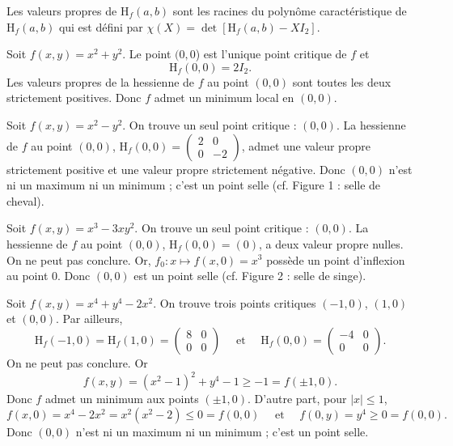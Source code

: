 \documentclass[class=report,crop=false]{standalone}
\begin{document}
\vskip6mm

Les valeurs propres de $\mbox{H}_f(a,b)$ sont les racines du polyn\^ome caractéristique de $\mbox{H}_f(a,b)$ qui est défini par $\chi (X)=\det \left[\mbox{H}_f(a,b)-XI_2\right]$.

\vskip6mm

Soit $f(x,y)=x^2+y^2$. Le point $(0,0$) est l'unique point critique de $f$ et
$$\mbox{H}_f(0,0)=2I_2.$$
Les valeurs propres de la hessienne de $f$ au point $(0,0)$ sont toutes les deux strictement positives. Donc $f$ admet un minimum local en $(0,0)$.

\vskip6mm

Soit $f(x,y)=x^2-y^2$. On trouve un seul point critique : $(0,0)$. La hessienne de $f$ au point $(0,0)$, $\mbox{H}_f(0,0)=\left(\begin{array}{cc}2 &0\\ 0&-2\end{array}\right)$, admet une valeur propre strictement positive et une valeur propre strictement négative. Donc $(0,0)$ n'est ni un maximum ni un minimum ; c'est un point selle (cf. Figure 1 : selle de cheval).

\vskip6mm

Soit $f(x,y)=x^3-3xy^2$. On trouve un seul point critique : $(0,0)$. La hessienne de $f$ au point $(0,0)$, $\mbox{H}_f(0,0)=(0)$, a deux valeur propre nulles. On ne peut pas conclure. Or, $f_0:x\mapsto f(x,0)=x^3$ possède un point d'inflexion au point $0$. Donc $(0,0)$ est un point selle (cf. Figure 2 : selle de singe).

\vskip6mm

Soit $f(x,y)=x^4+y^4-2x^2$. On trouve trois points critiques $(-1,0)$, $(1,0)$ et $(0,0)$. Par ailleurs,
$$\mbox{H}_f(-1,0)=\mbox{H}_f(1,0)=\left(\begin{array}{cc}8&0\\ 0&0\end{array}\right)\quad \mbox{ et }\quad \mbox{H}_f(0,0)=\left(\begin{array}{cc}-4&0\\ 0&0\end{array}\right).$$
On ne peut pas conclure. Or
$$f(x,y)=(x^2-1)^2+y^4-1\geq -1=f(\pm 1,0).$$
Donc $f$ admet un minimum aux points $(\pm 1,0)$. D'autre part, pour $|x|\leq 1$,
$$f(x,0)=x^4-2x^2=x^2(x^2-2)\leq 0=f(0,0)\quad \mbox{ et }\quad f(0,y)=y^4\geq 0=f(0,0).$$
Donc $(0,0)$ n'est ni un maximum ni un minimum ; c'est un point selle.
\end{document}
